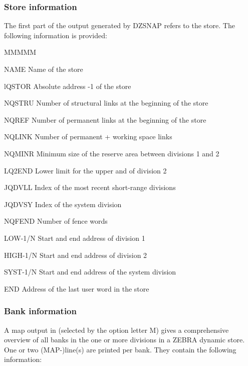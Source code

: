 \subsubsection{Store information}
\par The first part of the output generated by DZSNAP refers to the store.
The following information is provided:
\begin{DL}{MMMMM}
\item[NAME]Name of the store
\item[lQSTOR]Absolute address -1 of the store
\item[NQSTRU]Number of structural links at the beginning of the store
\item[NQREF]Number of permanent links at the beginning of the store
\item[NQLINK]Number of permanent + working space links
\item[NQMINR]Minimum size of the reserve area between divisions 1 and 2
\item[LQ2END]Lower limit for the upper and of division 2
\item[JQDVLL]Index of the most recent short-range divisions
\item[JQDVSY]Index of the system division
\item[NQFEND]Number of fence words
\item[LOW-1/N]Start and end address of division 1
\item[HIGH-1/N]Start and end address of division 2
\item[SYST-1/N]Start and end address of the system division
\item[END]Address of the last user word in the store
\end{DL}
\subsubsection{Bank information}
\par A map output in  (selected by the option letter M)
gives a comprehensive overview of all banks in
the one or more divisions in a ZEBRA dynamic store.
One or two (MAP-)line(s) are printed per bank.
They contain the following information:
